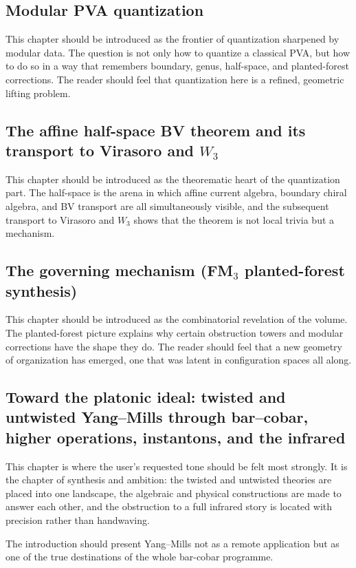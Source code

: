 \subsection*{Modular PVA quantization}
This chapter should be introduced as the frontier of quantization sharpened by modular data.  The question is not only how to quantize a classical PVA, but how to do so in a way that remembers boundary, genus, half-space, and planted-forest corrections.  The reader should feel that quantization here is a refined, geometric lifting problem.

\subsection*{The affine half-space BV theorem and its transport to Virasoro and $W_3$}
This chapter should be introduced as the theorematic heart of the quantization part.  The half-space is the arena in which affine current algebra, boundary chiral algebra, and BV transport are all simultaneously visible, and the subsequent transport to Virasoro and $W_3$ shows that the theorem is not local trivia but a mechanism.

\subsection*{The governing mechanism (FM$_3$ planted-forest synthesis)}
This chapter should be introduced as the combinatorial revelation of the volume.  The planted-forest picture explains why certain obstruction towers and modular corrections have the shape they do.  The reader should feel that a new geometry of organization has emerged, one that was latent in configuration spaces all along.

\subsection*{Toward the platonic ideal: twisted and untwisted Yang--Mills through bar--cobar, higher operations, instantons, and the infrared}
This chapter is where the user's requested tone should be felt most strongly.  It is the chapter of synthesis and ambition: the twisted and untwisted theories are placed into one landscape, the algebraic and physical constructions are made to answer each other, and the obstruction to a full infrared story is located with precision rather than handwaving.

The introduction should present Yang--Mills not as a remote application but as one of the true destinations of the whole bar-cobar programme.

